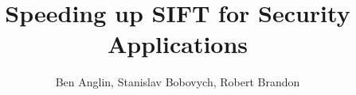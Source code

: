 \documentclass[a4paper,12pt]{article}
\begin{document}
\title{Speeding up SIFT for Security Applications}
\author{Ben Anglin, Stanislav Bobovych, Robert Brandon}
\maketitle

\graphicspath{{./images/}}

%





%
%

%
%
\end{document}
